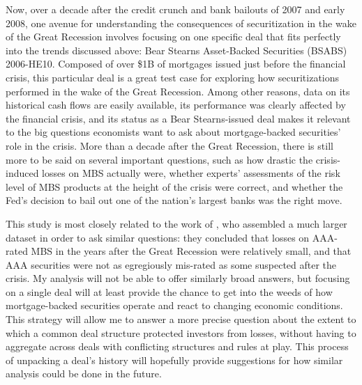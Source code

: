 \documentclass[12pt]{article}
\begin{document}
Now, over a decade after the credit crunch and bank bailouts of 2007 and early 2008, one avenue for understanding the consequences of securitization in the wake of the Great Recession involves focusing on one specific deal that fits perfectly into the trends discussed above: Bear Stearns Asset-Backed Securities (BSABS) 2006-HE10. Composed of over \$1B of mortgages issued just before the financial crisis, this particular deal is a great test case for exploring how securitizations performed in the wake of the Great Recession. Among other reasons, data on its historical cash flows are easily available, its performance was clearly affected by the financial crisis, and its status as a Bear Stearns-issued deal makes it relevant to the big questions economists want to ask about mortgage-backed securities’ role in the crisis. More than a decade after the Great Recession, there is still more to be said on several important questions, such as how drastic the crisis-induced losses on MBS actually were, whether experts’ assessments of the risk level of MBS products at the height of the crisis were correct, and whether the Fed’s decision to bail out one of the nation’s largest banks was the right move. 

This study is most closely related to the work of \textcite{ospina18}, who assembled a much larger dataset in order to ask similar questions: they concluded that losses on AAA-rated MBS in the years after the Great Recession were relatively small, and that AAA securities were not as egregiously mis-rated as some suspected after the crisis. My analysis will not be able to offer similarly broad answers, but focusing on a single deal will at least provide the chance to get into the weeds of how mortgage-backed securities operate and react to changing economic conditions. This strategy will allow me to answer a more precise question about the extent to which a common deal structure protected investors from losses, without having to aggregate across deals with conflicting structures and rules at play. This process of unpacking a deal's history will hopefully provide suggestions for how similar analysis could be done in the future.
\end{document}
